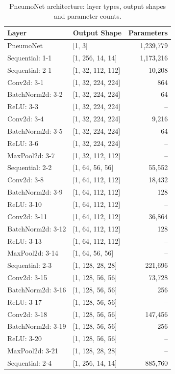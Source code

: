 \begin{table}[htbp]
\centering
\scriptsize
\renewcommand{\arraystretch}{0.86}
\caption{PneumoNet architecture: layer types, output shapes and parameter counts.}
\label{tab:pneumonet}
\begin{tabular}{llr}
\hline
Layer & Output Shape & Parameters \\
\hline
PneumoNet & [1, 3] & 1,239,779 \\
Sequential: 1-1 & [1, 256, 14, 14] & 1,173,216 \\
Sequential: 2-1 & [1, 32, 112, 112] & 10,208 \\
Conv2d: 3-1 & [1, 32, 224, 224] & 864 \\
BatchNorm2d: 3-2 & [1, 32, 224, 224] & 64 \\
ReLU: 3-3 & [1, 32, 224, 224] & -- \\
Conv2d: 3-4 & [1, 32, 224, 224] & 9,216 \\
BatchNorm2d: 3-5 & [1, 32, 224, 224] & 64 \\
ReLU: 3-6 & [1, 32, 224, 224] & -- \\
MaxPool2d: 3-7 & [1, 32, 112, 112] & -- \\
Sequential: 2-2 & [1, 64, 56, 56] & 55,552 \\
Conv2d: 3-8 & [1, 64, 112, 112] & 18,432 \\
BatchNorm2d: 3-9 & [1, 64, 112, 112] & 128 \\
ReLU: 3-10 & [1, 64, 112, 112] & -- \\
Conv2d: 3-11 & [1, 64, 112, 112] & 36,864 \\
BatchNorm2d: 3-12 & [1, 64, 112, 112] & 128 \\
ReLU: 3-13 & [1, 64, 112, 112] & -- \\
MaxPool2d: 3-14 & [1, 64, 56, 56] & -- \\
Sequential: 2-3 & [1, 128, 28, 28] & 221,696 \\
Conv2d: 3-15 & [1, 128, 56, 56] & 73,728 \\
BatchNorm2d: 3-16 & [1, 128, 56, 56] & 256 \\
ReLU: 3-17 & [1, 128, 56, 56] & -- \\
Conv2d: 3-18 & [1, 128, 56, 56] & 147,456 \\
BatchNorm2d: 3-19 & [1, 128, 56, 56] & 256 \\
ReLU: 3-20 & [1, 128, 56, 56] & -- \\
MaxPool2d: 3-21 & [1, 128, 28, 28] & -- \\
Sequential: 2-4 & [1, 256, 14, 14] & 885,760 \\

\end{tabular}
\end{table}
